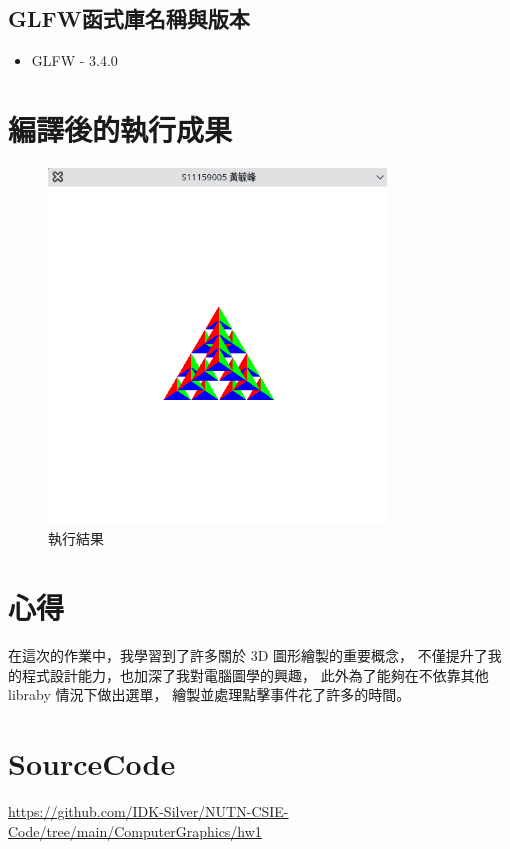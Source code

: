 \documentclass[12pt,a4paper]{article}
\begin{document}
\subsection*{GLFW函式庫名稱與版本}

\begin{itemize}
  \item GLFW - 3.4.0
\end{itemize}
\newpage
\section*{編譯後的執行成果}
\begin{figure}[h]
  \centering
  \includegraphics[width=0.8\textwidth]{img/hw2_result.png}
  \caption{執行結果}
\end{figure}

\newpage
\section*{心得}
在這次的作業中，我學習到了許多關於 3D 圖形繪製的重要概念，
不僅提升了我的程式設計能力，也加深了我對電腦圖學的興趣，
此外為了能夠在不依靠其他 libraby 情況下做出選單，
繪製並處理點擊事件花了許多的時間。

\section*{SourceCode}
\sloppy
\noindent \url{https://github.com/IDK-Silver/NUTN-CSIE-Code/tree/main/ComputerGraphics/hw1}
\end{document}
